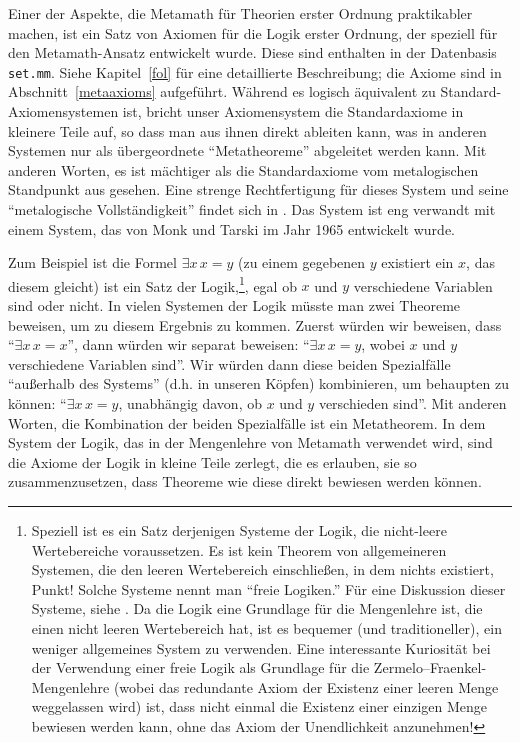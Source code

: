 Einer der Aspekte, die Metamath für Theorien erster Ordnung praktikabler machen, ist ein Satz von Axiomen für die Logik erster Ordnung, der speziell für den Metamath-Ansatz entwickelt wurde.  Diese sind enthalten in der Datenbasis \texttt{set.mm}.
Siehe Kapitel~\ref{fol} für eine detaillierte Beschreibung; die Axiome sind in Abschnitt~\ref{metaaxioms} aufgeführt.  Während es logisch äquivalent zu Standard-Axiomensystemen ist, bricht unser Axiomensystem die Standardaxiome in kleinere Teile auf, so dass man aus ihnen direkt ableiten kann, was in anderen Systemen nur als übergeordnete "`Metatheoreme"' abgeleitet werden kann.
Mit anderen Worten, es ist mächtiger als die Standardaxiome vom metalogischen Standpunkt aus gesehen.  Eine strenge Rechtfertigung für dieses System und seine "`metalogische Vollständigkeit"' findet sich in
\cite{Megill}.  Das System ist eng verwandt mit einem System, das von Monk und Tarski im Jahr 1965 \cite{Monks} entwickelt wurde.

Zum Beispiel ist die Formel $\exists x \, x = y $ (zu einem gegebenen $y$ existiert ein
$x$, das diesem gleicht) ist ein Satz der Logik,\footnote{Speziell ist es ein Satz
derjenigen Systeme der Logik, die nicht-leere Wertebereiche voraussetzen.  Es ist kein Theorem von allgemeineren Systemen, die den leeren Wertebereich einschließen, in dem nichts existiert, Punkt!  Solche Systeme nennt man "`freie Logiken."' Für eine Diskussion dieser Systeme, siehe \cite{Leblanc}.  Da die Logik eine Grundlage für die Mengenlehre ist, die einen nicht leeren Wertebereich hat, ist es bequemer (und traditioneller), ein weniger allgemeines System zu verwenden.  Eine interessante Kuriosität bei der Verwendung einer freie Logik als Grundlage für die Zermelo--Fraenkel-Mengenlehre (wobei das redundante Axiom der Existenz einer leeren Menge weggelassen wird) ist, dass nicht einmal die Existenz einer einzigen Menge bewiesen werden kann, ohne das Axiom der Unendlichkeit anzunehmen!}, egal ob $x$ und $y$ verschiedene Variablen sind oder nicht.
In vielen Systemen der Logik müsste man zwei Theoreme beweisen, um zu diesem Ergebnis zu kommen.  Zuerst würden wir beweisen, dass "`$\exists x \, x = x $"', dann würden wir separat beweisen: "`$\exists x \, x = y $, wobei $x$ und $y$ verschiedene Variablen sind"'.  Wir würden dann diese beiden Spezialfälle "`außerhalb des Systems"' (d.h. in unseren Köpfen) kombinieren, um behaupten zu können: "`$\exists x \, x = y $, unabhängig davon, ob $x$ und $y$ verschieden sind"'.  Mit anderen Worten, die Kombination der beiden Spezialfälle ist ein Metatheorem.  In dem System der Logik, das in der Mengenlehre von Metamath verwendet wird, sind die Axiome der Logik in kleine Teile zerlegt, die es erlauben, sie so zusammenzusetzen, dass Theoreme wie diese direkt bewiesen werden können.

